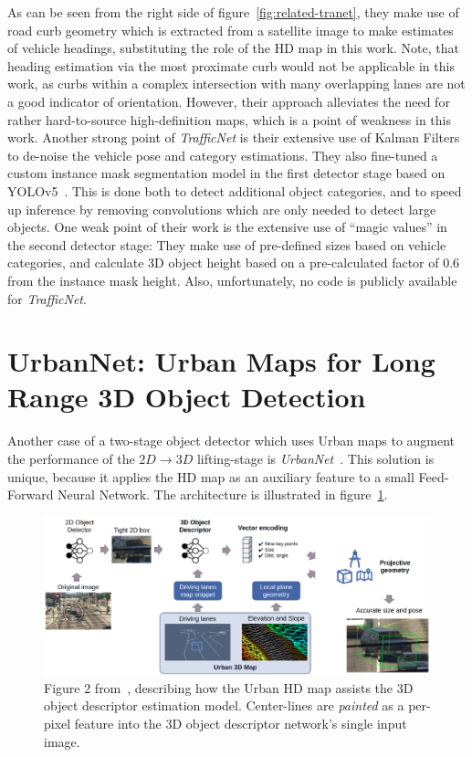 As can be seen from the right side of figure~\ref{fig:related-tranet}, they make use of road curb geometry which is extracted from a satellite image to make estimates of vehicle headings, substituting the role of the HD map in this work.
Note, that heading estimation via the most proximate curb would not be applicable in this work, as curbs within a complex intersection with many overlapping lanes are not a good indicator of orientation.
However, their approach alleviates the need for rather hard-to-source high-definition maps, which is a point of weakness in this work.
Another strong point of \textit{TrafficNet} is their extensive use of Kalman Filters~\cite{welch1995kalman} to de-noise the vehicle pose and category estimations.
They also fine-tuned a custom instance mask segmentation model in the first detector stage based on YOLOv5~\cite{glenn_jocher_2020_4154370}.
This is done both to detect additional object categories, and to speed up inference by removing convolutions which are only needed to detect large objects.
One weak point of their work is the extensive use of \enquote{magic values} in the second detector stage: They make use of pre-defined sizes based on vehicle categories, and calculate 3D object height based on a pre-calculated factor of \textit{$0.6$} from the instance mask height.
Also, unfortunately, no code is publicly available for \textit{TrafficNet}.

\section{UrbanNet: Urban Maps for Long Range 3D Object Detection}
\label{sec:related-urbnet}

Another case of a two-stage object detector which uses Urban maps to augment the performance of the $2D \rightarrow 3D$ lifting-stage is \textit{UrbanNet}~\cite{carrillo2021urbannet}.
This solution is unique, because it applies the HD map as an auxiliary feature to a small Feed-Forward Neural Network.
The architecture is illustrated in figure~\ref{fig:related-urbnet}.

\begin{figure}[htb]
    \centering
    \includegraphics[width=1.0\linewidth]{figures/urbannet_architecture}
    \caption{Figure 2 from~\cite{carrillo2021urbannet}, describing how the Urban HD map assists the 3D object descriptor estimation model. Center-lines are \textit{painted} as a per-pixel feature into the 3D object descriptor network's single input image.}
    \label{fig:related-urbnet}
\end{figure}

